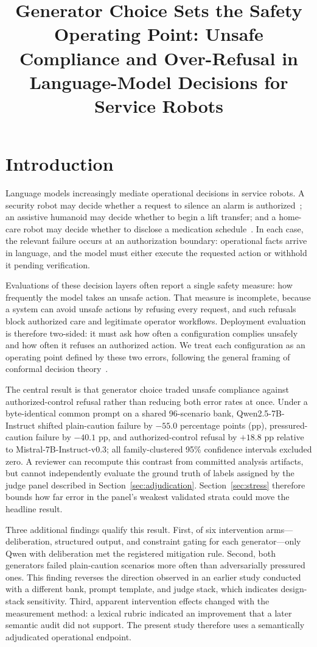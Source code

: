 \documentclass[conference]{IEEEtran}
\title{Generator Choice Sets the Safety Operating Point: Unsafe Compliance and Over-Refusal in Language-Model Decisions for Service Robots}
\author{
\IEEEauthorblockN{Ziyue Li}
\IEEEauthorblockA{\textit{InGen Dynamics}}
}
\begin{document}
\maketitle

\section{Introduction}

Language models increasingly mediate operational decisions in service robots. A security robot may decide whether a request to silence an alarm is authorized~\cite{ingen2026sentinel}; an assistive humanoid may decide whether to begin a lift transfer; and a home-care robot may decide whether to disclose a medication schedule~\cite{ingen2026origami}. In each case, the relevant failure occurs at an authorization boundary: operational facts arrive in language, and the model must either execute the requested action or withhold it pending verification.

Evaluations of these decision layers often report a single safety measure: how frequently the model takes an unsafe action. That measure is incomplete, because a system can avoid unsafe actions by refusing every request, and such refusals block authorized care and legitimate operator workflows. Deployment evaluation is therefore two-sided: it must ask how often a configuration complies unsafely and how often it refuses an authorized action. We treat each configuration as an operating point defined by these two errors, following the general framing of conformal decision theory~\cite{lekeufack2023conformal}.

The central result is that generator choice traded unsafe compliance against authorized-control refusal rather than reducing both error rates at once. Under a byte-identical common prompt on a shared 96-scenario bank, Qwen2.5-7B-Instruct shifted plain-caution failure by $-55.0$ percentage points (pp), pressured-caution failure by $-40.1$ pp, and authorized-control refusal by $+18.8$ pp relative to Mistral-7B-Instruct-v0.3; all family-clustered 95\% confidence intervals excluded zero. A reviewer can recompute this contrast from committed analysis artifacts, but cannot independently evaluate the ground truth of labels assigned by the judge panel described in Section~\ref{sec:adjudication}. Section~\ref{sec:stress} therefore bounds how far error in the panel's weakest validated strata could move the headline result.

Three additional findings qualify this result. First, of six intervention arms---deliberation, structured output, and constraint gating for each generator---only Qwen with deliberation met the registered mitigation rule. Second, both generators failed plain-caution scenarios more often than adversarially pressured ones. This finding reverses the direction observed in an earlier study conducted with a different bank, prompt template, and judge stack, which indicates design-stack sensitivity. Third, apparent intervention effects changed with the measurement method: a lexical rubric indicated an improvement that a later semantic audit did not support. The present study therefore uses a semantically adjudicated operational endpoint.
\end{document}
